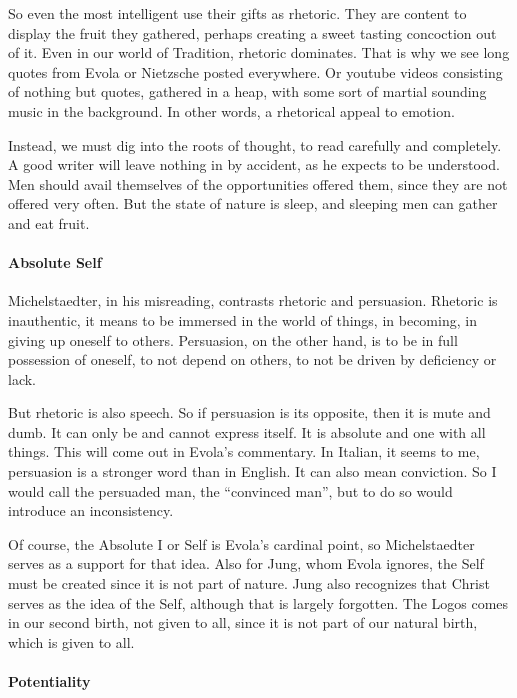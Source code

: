 So even the most intelligent use their gifts as rhetoric. They are content to display the fruit they gathered, perhaps creating a sweet tasting concoction out of it. Even in our world of Tradition, rhetoric dominates. That is why we see long quotes from Evola or Nietzsche posted everywhere. Or youtube videos consisting of nothing but quotes, gathered in a heap, with some sort of martial sounding music in the background. In other words, a rhetorical appeal to emotion.

Instead, we must dig into the roots of thought, to read carefully and completely. A good writer will leave nothing in by accident, as he expects to be understood. Men should avail themselves of the opportunities offered them, since they are not offered very often. But the state of nature is sleep, and sleeping men can gather and eat fruit.

\paragraph{Absolute Self}


Michelstaedter, in his misreading, contrasts rhetoric and persuasion. Rhetoric is inauthentic, it means to be immersed in the world of things, in becoming, in giving up oneself to others. Persuasion, on the other hand, is to be in full possession of oneself, to not depend on others, to not be driven by deficiency or lack.

But rhetoric is also speech. So if persuasion is its opposite, then it is mute and dumb. It can only be and cannot express itself. It is absolute and one with all things. This will come out in Evola's commentary. In Italian, it seems to me, persuasion is a stronger word than in English. It can also mean conviction. So I would call the persuaded man, the ``convinced man'', but to do so would introduce an inconsistency.

Of course, the Absolute I or Self is Evola's cardinal point, so Michelstaedter serves as a support for that idea. Also for Jung, whom Evola ignores, the Self must be created since it is not part of nature. Jung also recognizes that Christ serves as the idea of the Self, although that is largely forgotten. The Logos comes in our second birth, not given to all, since it is not part of our natural birth, which is given to all.

\paragraph{Potentiality}


